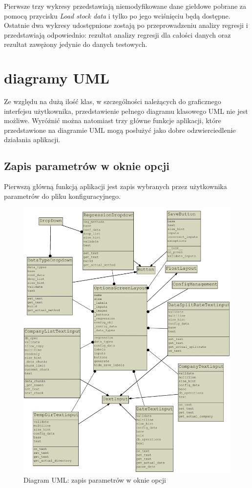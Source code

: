 Pierwsze trzy wykresy przedstawiają niemodyfikowane dane giełdowe pobrane za pomocą przycisku \textit{Load stock data} i tylko po jego wciśnięciu będą dostępne.
Ostatnie dwa wykresy udostępnione zostają po przeprowadzeniu analizy regresji i przedstawiają odpowiednio: rezultat analizy regresji dla całości danych oraz rezultat zawężony jedynie do danych testowych.

\section{diagramy UML}
Ze względu na dużą ilość klas, w szczególności należących do graficznego interfejsu użytkownika, przedstawienie pełnego diagramu klasowego UML nie jest możliwe.
Wyróżnić można natomiast trzy główne funkcje aplikacji, które przedstawione na diagramie UML mogą posłużyć jako dobre odzwierciedlenie działania aplikacji.

\subsection{Zapis parametrów w oknie opcji}
Pierwszą główną funkcją aplikacji jest zapis wybranych przez użytkownika parametrów do pliku konfiguracyjnego.\\
\begin{figure}[h!]
\centering
\includegraphics[width=150mm,heigh=100mm]{pictures/uml_save.png}
\caption{Diagram UML: zapis parametrów w oknie opcji}
\label{fig:Diagram UML: zapis parametrów w oknie opcji}
\end{figure}

